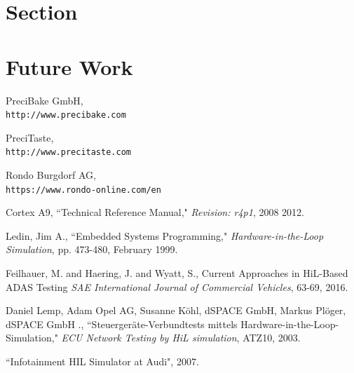 \documentclass{listhesis}
\begin{document}
\section{Section}
\section{Future Work}

\newpage


\cleardoublepage


\medskip

\begin{thebibliography}{100}



PreciBake GmbH,
\\\texttt{http://www.precibake.com} 

PreciTaste,
\\\texttt{http://www.precitaste.com} 

Rondo Burgdorf AG,
\\\texttt{https://www.rondo-online.com/en} 

 Cortex A9, ``Technical Reference Manual," \emph{Revision: r4p1}, 2008 2012.


 Ledin, Jim A., ``Embedded Systems Programming," \emph{Hardware-in-the-Loop Simulation}, pp. 473-480, February 1999.


Feilhauer, M. and Haering, J. and Wyatt, S., Current Approaches in HiL-Based ADAS Testing \emph {SAE International Journal of Commercial Vehicles}, 63-69, 2016.

 Daniel Lemp, Adam Opel AG,
Susanne Köhl, dSPACE GmbH,
Markus Plöger, dSPACE GmbH ., ``Steuergeräte-Verbundtests mittels
Hardware-in-the-Loop-Simulation," \emph{ECU Network Testing by HiL simulation}, ATZ10, 2003.

 ``Infotainment HIL Simulator at Audi", 2007.


\end{thebibliography}







%

\end{document}
